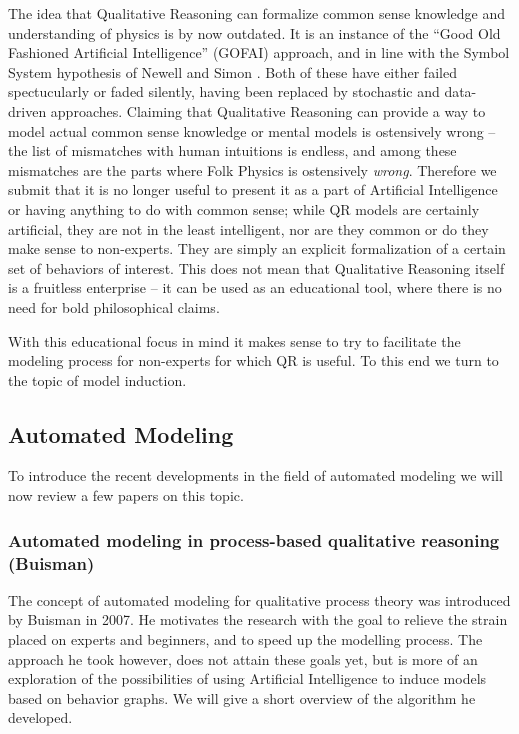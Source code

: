 \documentclass{article} %
\begin{document}
The idea that Qualitative Reasoning can formalize common sense knowledge and
understanding of physics is by now outdated. It is an instance of the ``Good
Old Fashioned Artificial Intelligence'' (GOFAI) approach, and in line with the
Symbol System hypothesis of Newell and Simon \cite{newell}. %
Both of these have either failed spectucularly or faded silently, having been
replaced by stochastic and data-driven approaches.  Claiming that Qualitative
Reasoning can provide a way to model actual common sense knowledge or mental
models is ostensively wrong -- the list of mismatches with human intuitions is
endless, and among these mismatches are the parts where Folk Physics is
ostensively {\em wrong}. Therefore we submit that it is no longer useful to
present it as a part of Artificial Intelligence or having anything to do with
common sense; while QR models are certainly artificial, they are not in the
least intelligent, nor are they common or do they make sense to non-experts.
They are simply an explicit formalization of a certain set of behaviors of
interest. This does not mean that Qualitative Reasoning itself is a fruitless
enterprise -- it can be used as an educational tool, where there is no need
for bold philosophical claims.

With this educational focus in mind it makes sense to try to facilitate the
modeling process for non-experts for which QR is useful. To this end we turn
to the topic of model induction.

\subsection{Automated Modeling} %

To introduce the recent developments in the field of automated modeling we
will now review a few papers on this topic.

\subsubsection{Automated modeling in process-based qualitative reasoning
(Buisman)}

The concept of automated modeling for qualitative process theory was
introduced by Buisman \cite{buisman} in 2007. He motivates the research with
the goal to relieve the strain placed on experts and beginners, and to speed
up the modelling process. The approach he took however, does not attain these
goals yet, but is more of an exploration of the possibilities of using
Artificial Intelligence to induce models based on behavior graphs. We will
give a short overview of the algorithm he developed.
\end{document}
